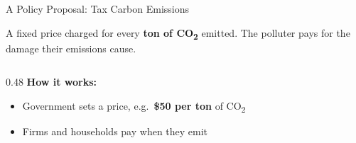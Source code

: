 \documentclass[9pt,english,aspectratio=169]{beamer}
\begin{document}
\begin{frame}{A Policy Proposal: Tax Carbon Emissions}

  \begin{definitionbox}
    A fixed price charged for every \textbf{ton of CO\textsubscript{2}} emitted.
    The polluter pays for the damage their emissions cause.
  \end{definitionbox}

  \vspace{0.5em}
  \begin{columns}[T]
    \begin{column}{0.48\textwidth}
      \textbf{How it works:}
      \begin{itemize}
        \item Government sets a price, e.g.\ \textbf{\$50 per ton} of CO\textsubscript{2}
        \item Firms and households pay when they emit

      \end{itemize}
    \end{column}
  \end{columns}

\end{frame}
\end{document}
